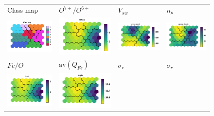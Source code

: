 \documentclass[border=0pt,varwidth=18cm,convert={outext=.jpg,density=300}]{standalone}%
\begin{document}
\pagecolor{white}%
\begin{figure}[h!]\centering
	\begin{tabular}{CCCC}
		Class map & $O^{7+}/O^{6+}$ & $V_{sw}$ & $n_p$ \\
		\includegraphics[width=4cm]{Amaya/classmap} &
		\includegraphics[width=4cm]{Amaya/comp-map-log_O7to6} &
		\includegraphics[width=4cm]{Amaya/comp-map-log_proton_speed} &
		\includegraphics[width=4cm]{Amaya/comp-map-log_proton_density}\\
		$Fe/O$ & $\text{av}(Q_{Fe})$ & $\sigma_c$ & $\sigma_r$ \\
		\includegraphics[width=4cm]{Amaya/comp-map-log_FetoO} &
		\includegraphics[width=4cm]{Amaya/comp-map-log_avqFe} &

\end{tabular}
\end{figure}
\end{document}
